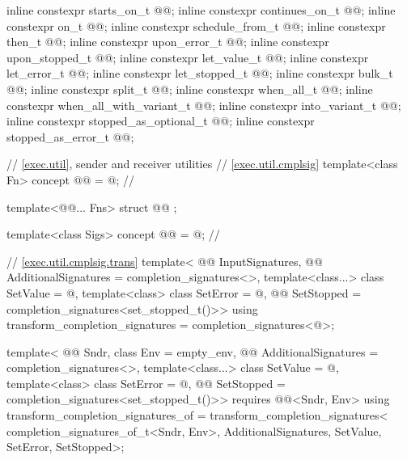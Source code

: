 \begin{codeblock}
{  inline constexpr starts_on_t @@{};
  inline constexpr continues_on_t @@{};
  inline constexpr on_t @@{};
  inline constexpr schedule_from_t @@{};
  inline constexpr then_t @@{};
  inline constexpr upon_error_t @@{};
  inline constexpr upon_stopped_t @@{};
  inline constexpr let_value_t @@{};
  inline constexpr let_error_t @@{};
  inline constexpr let_stopped_t @@{};
  inline constexpr bulk_t @@{};
  inline constexpr split_t @@{};
  inline constexpr when_all_t @@{};
  inline constexpr when_all_with_variant_t @@{};
  inline constexpr into_variant_t @@{};
  inline constexpr stopped_as_optional_t @@{};
  inline constexpr stopped_as_error_t @@{};

  // \ref{exec.util}, sender and receiver utilities
  // \ref{exec.util.cmplsig}
  template<class Fn>
    concept @@ = @\seebelownc@;                   // \expos

  template<@@... Fns>
    struct @@ {};

  template<class Sigs>
    concept @@ = @\seebelownc@;            // \expos

  // \ref{exec.util.cmplsig.trans}
  template<
    @@ InputSignatures,
    @@ AdditionalSignatures = completion_signatures<>,
    template<class...> class SetValue = @\seebelow@,
    template<class> class SetError = @\seebelow@,
    @@ SetStopped = completion_signatures<set_stopped_t()>>
  using transform_completion_signatures = completion_signatures<@\seebelow@>;

  template<
    @@ Sndr,
    class Env = empty_env,
    @@ AdditionalSignatures = completion_signatures<>,
    template<class...> class SetValue = @\seebelow@,
    template<class> class SetError = @\seebelow@,
    @@ SetStopped = completion_signatures<set_stopped_t()>>
      requires @@<Sndr, Env>
  using transform_completion_signatures_of =
    transform_completion_signatures<
      completion_signatures_of_t<Sndr, Env>,
      AdditionalSignatures, SetValue, SetError, SetStopped>;

}
\end{codeblock}

